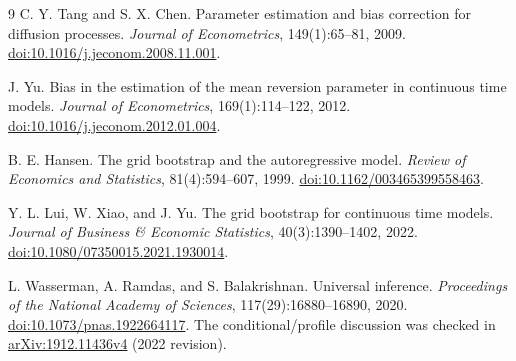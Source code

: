 \documentclass[11pt]{article}
\begin{document}
\begin{thebibliography}{9}
C. Y. Tang and S. X. Chen.
Parameter estimation and bias correction for diffusion processes.
\emph{Journal of Econometrics}, 149(1):65--81, 2009.
\href{https://doi.org/10.1016/j.jeconom.2008.11.001}{doi:10.1016/j.jeconom.2008.11.001}.

J. Yu.
Bias in the estimation of the mean reversion parameter in continuous time models.
\emph{Journal of Econometrics}, 169(1):114--122, 2012.
\href{https://doi.org/10.1016/j.jeconom.2012.01.004}{doi:10.1016/j.jeconom.2012.01.004}.

B. E. Hansen.
The grid bootstrap and the autoregressive model.
\emph{Review of Economics and Statistics}, 81(4):594--607, 1999.
\href{https://doi.org/10.1162/003465399558463}{doi:10.1162/003465399558463}.

Y. L. Lui, W. Xiao, and J. Yu.
The grid bootstrap for continuous time models.
\emph{Journal of Business \& Economic Statistics}, 40(3):1390--1402, 2022.
\href{https://doi.org/10.1080/07350015.2021.1930014}{doi:10.1080/07350015.2021.1930014}.

L. Wasserman, A. Ramdas, and S. Balakrishnan.
Universal inference.
\emph{Proceedings of the National Academy of Sciences}, 117(29):16880--16890, 2020.
\href{https://doi.org/10.1073/pnas.1922664117}{doi:10.1073/pnas.1922664117}.
The conditional/profile discussion was checked in
\href{https://arxiv.org/abs/1912.11436v4}{arXiv:1912.11436v4} (2022 revision).
\end{thebibliography}
\end{document}
